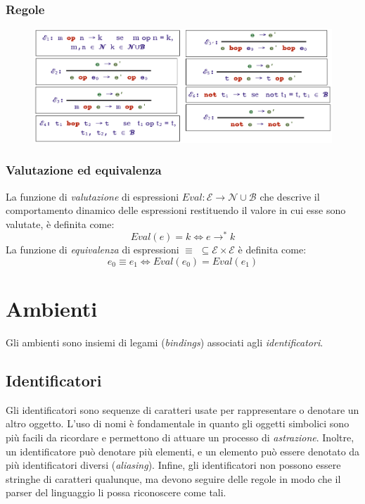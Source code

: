 \documentclass[a4paper,oneside,titlepage]{book}
\begin{document}
\subsection{Regole}
\begin{figure}[htp]
	\centering
	\includegraphics[width=\textwidth, height=\textheight, keepaspectratio]{expRegole1.png}
\end{figure}

\subsection{Valutazione ed equivalenza}
La funzione di \textit{valutazione} di espressioni $Eval: \mathcal{E} \rightarrow \mathcal{N} \cup \mathcal{B}$ che descrive il comportamento dinamico delle espressioni restituendo il valore in cui esse sono valutate, è definita come:
\[ Eval(e)=k \iff e \to^* k \]
La funzione di \textit{equivalenza} di espressioni $\equiv$ $\subseteq \mathcal{E} \times \mathcal{E}$ è definita come:
\[ e_0 \equiv e_1 \iff Eval(e_0)=Eval(e_1) \]


\chapter{Ambienti}
Gli ambienti sono insiemi di legami (\textit{bindings}) associati agli \textit{identificatori}.

\section{Identificatori}
Gli identificatori sono sequenze di caratteri usate per rappresentare o denotare un altro oggetto. L'uso di nomi è fondamentale in quanto gli oggetti simbolici sono più facili da ricordare e permettono di attuare un processo di \textit{astrazione}. Inoltre, un identificatore può denotare più elementi, e un elemento può essere denotato da più identificatori diversi (\textit{aliasing}). Infine, gli identificatori non possono essere stringhe di caratteri qualunque, ma devono seguire delle regole in modo che il parser del linguaggio li possa riconoscere come tali.
\end{document}
